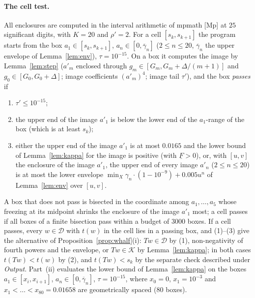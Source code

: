 \documentclass[11pt,a4paper]{article}
\theoremstyle{definition}
\theoremstyle{remark}
\newcommand{\cD}{\mathcal{D}}
\newcommand{\cK}{\mathcal{K}}
\begin{document}
\paragraph{The cell test.}
All enclosures are computed in the interval arithmetic of mpmath [Mp] at $25$ significant digits, with $K=20$ and $\rho'=2$.
For a cell $[s_k,s_{k+1}]$ the program starts from the box $a_1\in[s_k,s_{k+1}]$, $a_n\in[0,\overline\gamma_n]$ ($2\le n\le20$, $\overline\gamma_n$ the upper envelope of Lemma~\ref{lem:env}), $\tau=10^{-15}$.
On a box it computes the image by Lemma~\ref{lem:step} ($a'_m$ enclosed through $g_m\in[G_m,G_m+\Delta/(m+1)]$ and $g_0\in[G_0,G_0+\Delta]$; image coefficients $(a'_m)^4$; image tail $\tau'$), and the box \emph{passes} if
\begin{enumerate}[label=(\arabic*),nosep]
\item $\tau'\le10^{-15}$;
\item the upper end of the image $a'_1$ is below the lower end of the $a_1$-range of the box (which is at least $s_k$);
\item either the upper end of the image $a'_1$ is at most $0.0165$ and the lower bound of Lemma~\ref{lem:kappa} for the image is positive (with $\underline F>0$), or, with $[u,v]$ the enclosure of the image $a'_1$, the upper end of every image $a'_n$ ($2\le n\le20$) is at most the lower envelope $\min_X\gamma_n\cdot(1-10^{-9})+0.005u^n$ of Lemma~\ref{lem:env} over $[u,v]$.
\end{enumerate}
A box that does not pass is bisected in the coordinate among $a_1,\dots,a_5$ whose freezing at its midpoint shrinks the enclosure of the image $a'_1$ most; a cell passes if all boxes of a finite bisection pass within a budget of $3000$ boxes.
If a cell passes, every $w\in\cD$ with $t(w)$ in the cell lies in a passing box, and (1)--(3) give the alternative of Proposition~\ref{prop:whalf}(i): $Tw\in\cD$ by (1), non-negativity of fourth powers and the envelope, or $Tw\in\cK$ by Lemma~\ref{lem:kappa}; in both cases $t(Tw)<t(w)$ by (2), and $t(Tw)<s_k$ by the separate check described under \emph{Output}.
Part~(ii) evaluates the lower bound of Lemma~\ref{lem:kappa} on the boxes $a_1\in[x_i,x_{i+1}]$, $a_n\in[0,\overline\gamma_n]$, $\tau=10^{-15}$, where $x_0=0$, $x_1=10^{-3}$ and $x_1<\dots<x_{80}=0.01658$ are geometrically spaced ($80$ boxes).
\end{document}
